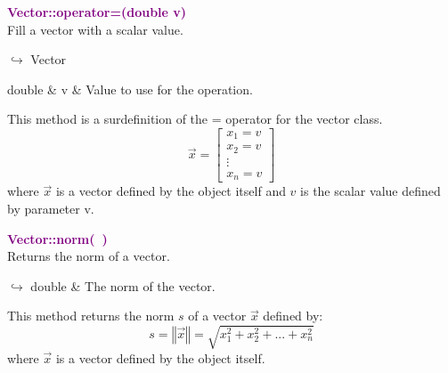 \textcolor{purple}{\textbf{Vector::operator=(double v)}}\label{Vector::operator=(double v)}\\
Fill a vector with a scalar value.\vspace*{-0.5em}
\begin{tcolorbox}[grow to left by=-1cm, width=\textwidth-1cm,myArgs,tabularx={l|R}]
$\hookrightarrow$ Vector
\end{tcolorbox}

\begin{tcolorbox}[width=\textwidth,myArgs,tabularx={ll|R}]
double & v & Value to use for the operation.
\end{tcolorbox}

This method is a surdefinition of the = operator for the vector class.
\begin{equation*}
\overrightarrow{x}=\left[\begin{array}{c}
  x_{1}=v\\
  x_{2}=v\\
  \vdots\\
  x_{n}=v
  \end{array}\right]
\end{equation*}
where $\overrightarrow{x}$ is a vector defined by the object itself and $v$ is the scalar value defined by parameter v.

\textcolor{purple}{\textbf{Vector::norm(~)}}\label{Vector::norm()}\\
Returns the norm of a vector.\vspace*{-0.5em}
\begin{tcolorbox}[grow to left by=-1cm, width=\textwidth-1cm,myArgs,tabularx={l|R}]
$\hookrightarrow$ double & The norm of the vector.
\end{tcolorbox}

This method returns the norm $s$ of a vector $\overrightarrow{x}$ defined by:
\begin{equation*}
s = \left\Vert \overrightarrow{x} \right\Vert = \sqrt {x_{1}^2 + x_{2}^2 + ... + x_{n}^2}
\end{equation*}
where $\overrightarrow{x}$ is a vector defined by the object itself.

